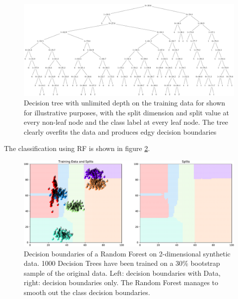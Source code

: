 \documentclass[10pt]{article}
\begin{document}
\begin{figure}[H]
    \centering
    \includegraphics[width=\textwidth]{decision_tree}
    \caption{Decision tree with unlimited depth on the training data for shown for illustrative purposes, with the split dimension and split value at every non-leaf node and the class label at every leaf node. The tree clearly overfits the data and produces edgy decision boundaries}
    \label{fig:decision_tree}
\end{figure}
The classification using \acrlong{RF} is shown in figure \ref{fig:rf}.

\begin{figure}[H]
    \centering
    \includegraphics[width=\textwidth]{rf}
    \caption{Decision boundaries of a Random Forest on 2-dimensional synthetic data. 1000 Decision Trees have been trained on a 30\% bootstrap sample of the original data. Left: decision boundaries with Data, right: decision boundaries only. The Random Forest manages to smooth  out the class decision boundaries.}
    \label{fig:rf}
\end{figure}
\end{document}
